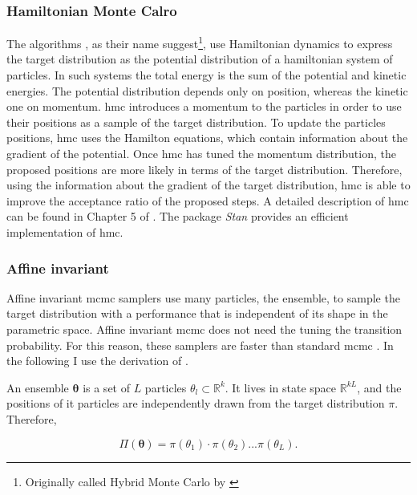 \subsubsection{Hamiltonian Monte Calro}
The  algorithms \citep{Duane1987,Neal1996}, as their name suggest\footnote{Originally called Hybrid Monte Carlo by \citep{Duane1987}}, use Hamiltonian dynamics to express the target distribution as the potential distribution of a hamiltonian system of particles. In such systems the total energy is the sum of the potential and kinetic energies. The potential distribution depends only on position, whereas the kinetic one on momentum. \gls{hmc} introduces a momentum to the particles in order to use their positions as a sample of the target distribution. To update the particles positions, \gls{hmc} uses the Hamilton equations, which contain information about the gradient of the potential. Once \gls{hmc} has tuned the momentum distribution, the proposed positions are more likely in terms of the target distribution. Therefore, using the information about the gradient of the target distribution, \gls{hmc} is able to improve the acceptance ratio of the proposed steps. A detailed description of \gls{hmc} can be found in Chapter 5 of \citet{Brooks2011}. The package \emph{Stan} \citep{Stan} provides an efficient implementation of \gls{hmc}.

\subsubsection{Affine invariant}
Affine invariant \gls{mcmc} samplers use many particles, the ensemble, to sample the target distribution with a performance that is independent of its shape in the parametric space. Affine invariant \gls{mcmc} does not need the tuning the transition probability. For this reason, these samplers are faster than standard \gls{mcmc} \citep{Goodman2010}. In the following I use the derivation of \citet{Goodman2010}.


{An ensemble $\boldsymbol{\theta}$ is a set of $L$ particles $\theta_l \subset \mathbb{R}^k$. It lives in state space $\mathbb{R}^{kL}$, and the positions of it particles are independently drawn from the target distribution $\pi$.} Therefore,

\begin{equation}
\Pi(\boldsymbol{\theta})=\pi(\theta_1)\cdot\pi(\theta_2)...\pi(\theta_L).\nonumber 
\end{equation}

